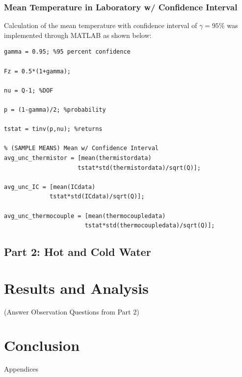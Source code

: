 \documentclass{article}
\begin{document}
\subsubsection{Mean Temperature in Laboratory w/ Confidence Interval}
Calculation of the mean temperature with confidence interval of $\gamma = 95\%$ was implemented through MATLAB as shown below:
\begin{lstlisting}[style=Matlab-editor]
% Confidence Interval in Laboratory
gamma = 0.95; %95 percent confidence

Fz = 0.5*(1+gamma);

nu = Q-1; %DOF

p = (1-gamma)/2; %probability

tstat = tinv(p,nu); %returns 

% (SAMPLE MEANS) Mean w/ Confidence Interval
avg_unc_thermistor = [mean(thermistordata) 
                     tstat*std(thermistordata)/sqrt(Q)];

avg_unc_IC = [mean(ICdata) 
             tstat*std(ICdata)/sqrt(Q)];

avg_unc_thermocouple = [mean(thermocoupledata)  
                       tstat*std(thermocoupledata)/sqrt(Q)];
\end{lstlisting}




\subsection{Part 2: Hot and Cold Water}


\section{Results and Analysis}
(Answer Observation Questions from Part 2)


\section{Conclusion}




\newpage
\thispagestyle{empty}  %
\begin{center}
	\vspace*{\fill}
	{\Huge Appendices}
	\vspace*{\fill}
\end{center}
\end{document}
